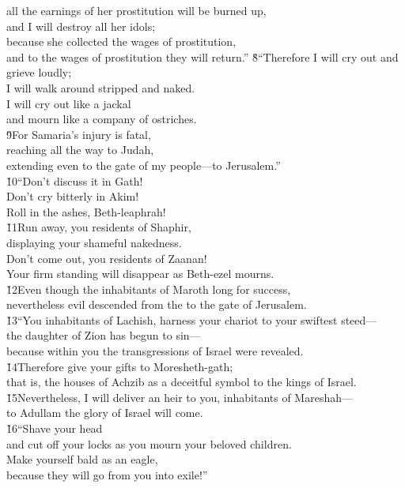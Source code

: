 \begin{poetry}
\poemll    all the earnings of her prostitution will be burned up, \\
\poemlll       and I will destroy all her idols; \\
\poeml because she collected the wages of prostitution, \\
\poemll    and to the wages of prostitution they will return.''
\poeml \v{8}``Therefore I will cry out and grieve loudly; \\
\poemll    I will walk around stripped and naked. \\
\poeml I will cry out like a jackal \\
\poemll    and mourn like a company of ostriches. \\
\poeml \v{9}For Samaria's injury is fatal, \\
\poemll    reaching all the way to Judah, \\
\poemlll       extending even to the gate of my people---to Jerusalem.'' \\
\poeml \v{10}``Don't discuss it in Gath! \\
\poemll    Don't cry bitterly in Akim! \\
\poemlll       Roll in the ashes, Beth-leaphrah! \\
\poeml \v{11}Run away, you residents of Shaphir, \\
\poemll    displaying your shameful nakedness. \\
\poeml Don't come out, you residents of Zaanan! \\
\poemll    Your firm standing will disappear as Beth-ezel mourns. \\
\poeml \v{12}Even though the inhabitants of Maroth long for success, \\
\poemll    nevertheless evil descended from the  to the gate of Jerusalem. \\
\poeml \v{13}``You inhabitants of Lachish, harness your chariot to your swiftest steed--- \\
\poemll    the daughter of Zion has begun to sin--- \\
\poeml because within you the transgressions of Israel were revealed. \\
\poeml \v{14}Therefore give your gifts to Moresheth-gath; \\
\poemll    that is, the houses of Achzib as a deceitful symbol to the kings of Israel. \\
\poeml \v{15}Nevertheless, I will deliver an heir to you, inhabitants of Mareshah--- \\
\poemll    to Adullam the glory of Israel will come. \\
\poeml \v{16}``Shave your head \\
\poemll    and cut off your locks as you mourn your beloved children. \\
\poeml Make yourself bald as an eagle, \\
\poemll    because they will go from you into exile!''
\end{poetry}

